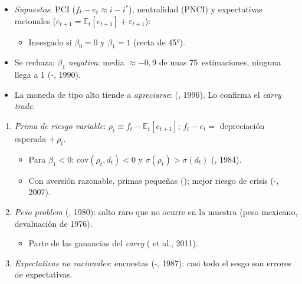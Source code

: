 \documentclass{article}
\begin{document}
\begin{columnas}
\begin{itemize}
\item \emph{Supuestos}: PCI ($f_t-e_t\approx i-i^{*}$), neutralidad (PNCI) y expectativas racionales ($e_{t+1}=\mathbb{E}_t[e_{t+1}]+\varepsilon_{t+1}$):
  \begin{itemize}
  \item Insesgado si $\beta_0=0$ y $\beta_1=1$ (recta de 45°).
  \end{itemize}
\end{itemize}
\begin{itemize}
\item Se rechaza; $\beta_1$ \emph{negativa}: media $\approx-0{,}9$ de unas 75~estimaciones, ninguna llega a 1 (-, 1990).
\item La moneda de tipo alto tiende a \emph{apreciarse}:  (, 1996). Lo confirma el \emph{carry trade}.
\end{itemize}
\begin{enumerate}
\item \emph{Prima de riesgo variable}: $\rho_t\equiv f_t-\mathbb{E}_t[e_{t+1}]$; $f_t-e_t=$ depreciación esperada $+\,\rho_t$.
  \begin{itemize}
  \item Para $\beta_1<0$: $\mathrm{cov}(\rho_t,d_t)<0$ y $\sigma(\rho_t)>\sigma(d_t)$ (, 1984).
  \item Con aversión razonable, primas pequeñas (); mejor riesgo de crisis (-, 2007).
  \end{itemize}
\item \emph{\emph{Peso problem}} (, 1980): salto raro que no ocurre en la muestra (peso mexicano, devaluación de 1976).
  \begin{itemize}
  \item Parte de las ganancias del \emph{carry} ( et al., 2011).
  \end{itemize}
\item \emph{Expectativas no racionales}: encuestas (-, 1987): casi todo el sesgo son errores de expectativas.

\end{enumerate}
\end{columnas}
\end{document}

